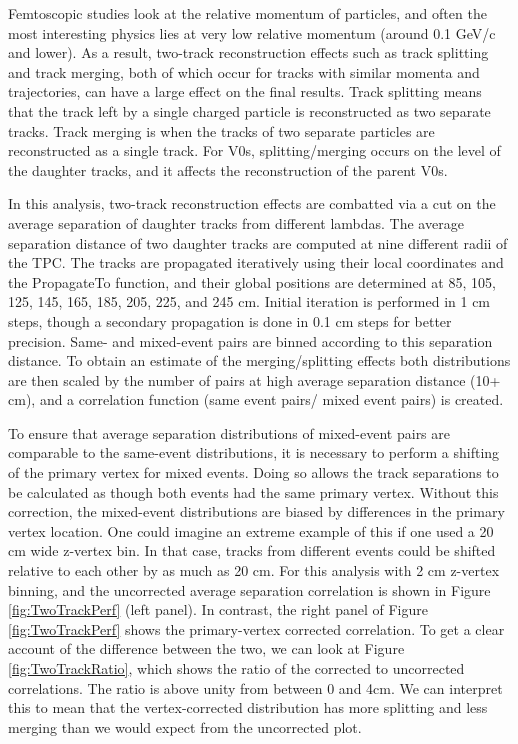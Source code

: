 Femtoscopic studies look at the relative momentum of particles, and often the most interesting physics lies at very low relative momentum (around 0.1 GeV/c and lower).  As a result, two-track reconstruction effects such as track splitting and track merging, both of which occur for tracks with similar momenta and trajectories, can have a large effect on the final results.  Track splitting means that the track left by a single charged particle is reconstructed as two separate tracks. Track merging is when the tracks of two separate particles are reconstructed as a single track.  For V0s, splitting/merging occurs on the level of the daughter tracks, and it affects the reconstruction of the parent V0s.

In this analysis, two-track reconstruction effects are combatted via a cut on the average separation of daughter tracks from different lambdas.  The average separation distance of two daughter tracks are computed at nine different radii of the TPC.  The tracks are propagated iteratively using their local coordinates and the PropagateTo function, and their global positions are determined at 85, 105, 125, 145, 165, 185, 205, 225, and 245 cm.  Initial iteration is performed in 1 cm steps, though a secondary propagation is done in 0.1 cm steps for better precision.  Same- and mixed-event pairs are binned according to this separation distance.  To obtain an estimate of the merging/splitting effects both distributions are then scaled by the number of pairs at high average separation distance (10+ cm), and a correlation function (same event pairs/ mixed event pairs) is created. 

To ensure that average separation distributions of mixed-event pairs are comparable to the same-event distributions, it is necessary to perform a shifting of the primary vertex for mixed events.  Doing so allows the track separations to be calculated as though both events had the same primary vertex.  Without this correction, the mixed-event distributions are biased by differences in the primary vertex location.  One could imagine an extreme example of this if one used a 20 cm wide z-vertex bin.  In that case, tracks from different events could be shifted relative to each other by as much as 20 cm.  For this analysis with 2 cm z-vertex binning, and the uncorrected average separation correlation is shown in Figure \ref{fig:TwoTrackPerf} (left panel).  In contrast, the right panel of Figure \ref{fig:TwoTrackPerf} shows the primary-vertex corrected correlation.  To get a clear account of the difference between the two, we can look at Figure \ref{fig:TwoTrackRatio}, which shows the ratio of the corrected to uncorrected correlations.  The ratio is above unity from between 0 and 4cm.  We can interpret this to mean that the vertex-corrected distribution has more splitting and less merging than we would expect from the uncorrected plot.

